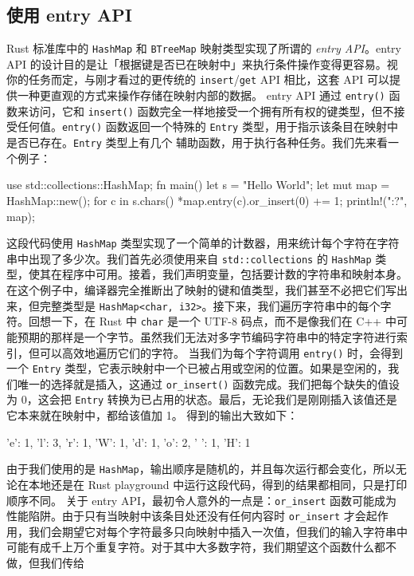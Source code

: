 \subsection{使用 entry API}
\label{idx:idx_e701fb6e}
Rust 标准库中的 \texttt{HashMap} 和 \texttt{BTreeMap} 映射类型实现了所谓的 \emph{entry API}。entry API 的设计目的是让「根据键是否已在映射中」来执行条件操作变得更容易。视你的任务而定，与刚才看过的更传统的 \texttt{insert}/\texttt{get} API 相比，这套 API 可以提供一种更直观的方式来操作存储在映射内部的数据。
entry API 通过 \texttt{entry()} 函数来访问，它和 \texttt{insert()} 函数完全一样地接受一个拥有所有权的键类型，但不接受任何值。\texttt{entry()} 函数返回一个特殊的
\texttt{Entry} 类型，用于指示该条目在映射中是否已存在。\texttt{Entry} 类型上有几个
辅助函数，用于执行各种任务。我们先来看一个例子：
\begin{codebox}[rust]
use std::collections::HashMap;
fn main() {
    let s = "Hello World";
    let mut map = HashMap::new();
    for c in s.chars() {
        *map.entry(c).or_insert(0) += 1;
    }
    println!("{:?}", map);
}
\end{codebox}
\label{idx:idx_110c01d1}
这段代码使用 \texttt{HashMap} 类型实现了一个简单的计数器，用来统计每个字符在字符串中出现了多少次。我们首先必须使用来自 \texttt{std::\allowbreak{}collections} 的 \texttt{HashMap} 类型，使其在程序中可用。接着，我们声明变量，包括要计数的字符串和映射本身。在这个例子中，编译器完全推断出了映射的键和值类型，我们甚至不必把它们写出来，但完整类型是 \texttt{HashMap<\allowbreak{}char,\allowbreak{} i32>\allowbreak{}}。接下来，我们遍历字符串中的每个字符。回想一下，在 Rust 中 \texttt{char} 是一个 UTF-\allowbreak{}8 码点，而不是像我们在 C++ 中可能预期的那样是一个字节。虽然我们无法对多字节编码字符串中的特定字符进行索引，但可以高效地遍历它们的字符。
当我们为每个字符调用 \texttt{entry()} 时，会得到一个 \texttt{Entry} 类型，它表示映射中一个已被占用或空闲的位置。如果是空闲的，我们唯一的选择就是插入，这通过 \texttt{or\_\allowbreak{}insert(\allowbreak{})\allowbreak{}} 函数完成。我们把每个缺失的值设为 0，这会把 \texttt{Entry} 转换为已占用的状态。最后，无论我们是刚刚插入该值还是它本来就在映射中，都给该值加 1。
得到的输出大致如下：
\begin{codeboxdark}
{'e': 1, 'l': 3, 'r': 1, 'W': 1, 'd': 1, 'o': 2, ' ': 1, 'H': 1}
\end{codeboxdark}
由于我们使用的是 \texttt{HashMap}，输出顺序是随机的，并且每次运行都会变化，所以无论在本地还是在 Rust playground 中运行这段代码，得到的结果都相同，只是打印顺序不同。
关于 entry API，最初令人意外的一点是：\texttt{or\_insert} 函数可能成为性能陷阱。由于只有当映射中该条目处还没有任何内容时 \texttt{or\_insert} 才会起作用，我们会期望它对每个字符最多只向映射中插入一次值，但我们的输入字符串中可能有成千上万个重复字符。对于其中大多数字符，我们期望这个函数什么都不做，但我们传给

